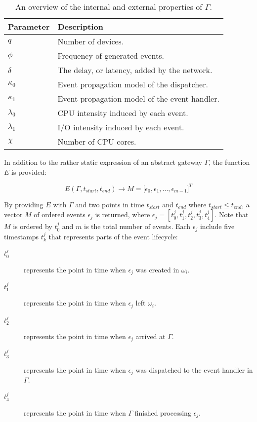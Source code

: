 \begin{table}[h!]
    \caption{An overview of the internal and external properties of $\Gamma$.}
    \label{tab:gateway_config}

    \begin{center}
        \begin{tabular}{|l|l|}
            \hline
            Parameter   & Description \\
            \hline
            $q$         & Number of devices. \\
            $\phi$      & Frequency of generated events. \\
            $\delta$    & The delay, or latency, added by the network. \\
            $\kappa_0$  & Event propagation model of the dispatcher. \\
            $\kappa_1$  & Event propagation model of the event handler. \\
            $\lambda_0$ & CPU intensity induced by each event. \\
            $\lambda_1$ & I/O intensity induced by each event. \\
            $\chi$      & Number of CPU cores. \\
            \hline
        \end{tabular}
    \end{center}
\end{table}

In addition to the rather static expression of an abstract gateway $\Gamma$,
the function $E$ is provided:

\begin{equation}
E(\Gamma, t_{start}, t_{end}) \to M = \big[ \epsilon_0, \epsilon_1, ...,
\epsilon_{m-1} \big]^T
\end{equation}

By providing $E$ with $\Gamma$ and two points in time $t_{start}$ and $t_{end}$
where $t_{start} \leq t_{end}$, a vector $M$ of ordered events $\epsilon_j$ is
returned, where $\epsilon_j = [ t_0^j, t_1^j, t_2^j, t_3^j, t_4^j ]$. Note that
$M$ is ordered by $t_0^j$ and $m$ is the total number of events. Each
$\epsilon_j$ include five timestamps $t_k^j$ that represents parts of the event
lifecycle:

\begin{description}
\item[$t_0^j$] represents the point in time when $\epsilon_j$ was created in
    $\omega_i$.
\item[$t_1^j$] represents the point in time when $\epsilon_j$ left $\omega_i$.
\item[$t_2^j$] represents the point in time when $\epsilon_j$ arrived at
    $\Gamma$.
\item[$t_3^j$] represents the point in time when $\epsilon_j$ was dispatched to
    the event handler in $\Gamma$.
\item[$t_4^j$] represents the point in time when $\Gamma$ finished processing
    $\epsilon_j$.
\end{description}

